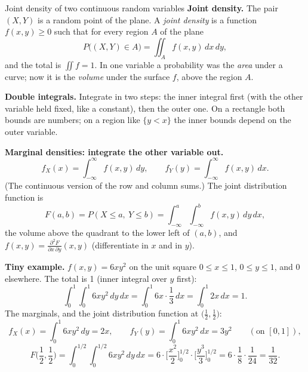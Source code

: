 \begin{key}{Joint density of two continuous random variables}
	\setlength{\parskip}{5pt}
	\textbf{Joint density.} The pair $(X,Y)$ is a random point of the plane.
	A \emph{joint density} is a function $f(x,y)\ge0$ such that for every
	region $A$ of the plane
	\[ P\big((X,Y)\in A\big)=\iint_A f(x,y)\,dx\,dy, \]
	and the total is $\iint f=1$. In one variable a probability was the
	\emph{area} under a curve; now it is the \emph{volume} under the surface
	$f$, above the region $A$.

	\textbf{Double integrals.} Integrate in two steps: the inner integral
	first (with the other variable held fixed, like a constant), then the
	outer one. On a rectangle both bounds are numbers; on a region like
	$\{y<x\}$ the inner bounds depend on the outer variable.

	\textbf{Marginal densities: integrate the other variable out.}
	\[ f_X(x)=\int_{-\infty}^{\infty}f(x,y)\,dy,\qquad
		f_Y(y)=\int_{-\infty}^{\infty}f(x,y)\,dx. \]
	(The continuous version of the row and column sums.) The joint
	distribution function is
	\[ F(a,b)=P(X\le a,\ Y\le b)=\int_{-\infty}^{a}\!\int_{-\infty}^{b}
		f(x,y)\,dy\,dx, \]
	the volume above the quadrant to the lower left of $(a,b)$, and
	$f(x,y)=\frac{\partial^2F}{\partial x\,\partial y}(x,y)$ (differentiate in
	$x$ and in $y$).

	\textbf{Tiny example.} $f(x,y)=6xy^2$ on the unit square $0\le x\le1$,
	$0\le y\le1$, and 0 elsewhere. The total is 1 (inner integral over $y$
	first):
	\[ \int_0^1\!\!\int_0^1 6xy^2\,dy\,dx=\int_0^1 6x\cdot\frac13\,dx
		=\int_0^1 2x\,dx=1. \]
	The marginals, and the joint distribution function at
	$\big(\frac12,\frac12\big)$:
	\[ f_X(x)=\int_0^1 6xy^2\,dy=2x,\qquad f_Y(y)=\int_0^1 6xy^2\,dx=3y^2
		\qquad(\text{on }[0,1]), \]
	\[ F\Big(\frac12,\frac12\Big)=\int_0^{1/2}\!\!\int_0^{1/2}6xy^2\,dy\,dx
		=6\cdot\Big[\frac{x^2}{2}\Big]_0^{1/2}\cdot\Big[\frac{y^3}{3}\Big]_0^{1/2}
		=6\cdot\frac18\cdot\frac1{24}=\frac1{32}. \]


\end{key}
